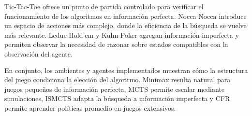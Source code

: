 \documentclass[letterpaper,12pt]{article}
\begin{document}
Tic-Tac-Toe ofrece un punto de partida controlado para verificar el funcionamiento de los algoritmos en información perfecta. Nocca Nocca introduce un espacio de acciones más complejo, donde la eficiencia de la búsqueda se vuelve más relevante. Leduc Hold'em y Kuhn Poker agregan información imperfecta y permiten observar la necesidad de razonar sobre estados compatibles con la observación del agente.

En conjunto, los ambientes y agentes implementados muestran cómo la estructura del juego condiciona la elección del algoritmo. Minimax resulta natural para juegos pequeños de información perfecta, MCTS permite escalar mediante simulaciones, ISMCTS adapta la búsqueda a información imperfecta y CFR permite aprender políticas promedio en juegos extensivos.



\end{document}

